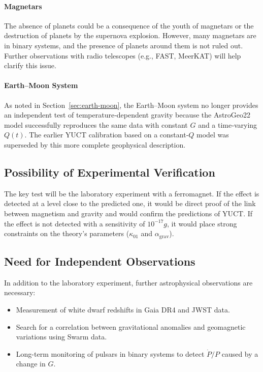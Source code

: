 \documentclass[12pt]{article}
\theoremstyle{remark}
\begin{document}
	\paragraph{Magnetars}
	The absence of planets could be a consequence of the youth of magnetars or the destruction of planets by the supernova explosion. However, many magnetars are in binary systems, and the presence of planets around them is not ruled out. Further observations with radio telescopes (e.g., FAST, MeerKAT) will help clarify this issue.
	
	\paragraph{Earth–Moon System}
	As noted in Section~\ref{sec:earth-moon}, the Earth–Moon system no longer provides an independent test of temperature‑dependent gravity because the AstroGeo22 model successfully reproduces the same data with constant \(G\) and a time‑varying \(Q(t)\). The earlier YUCT calibration based on a constant‑\(Q\) model was superseded by this more complete geophysical description.
	
	\subsection{Possibility of Experimental Verification}
	\label{subsec:discussion-experiment}
	
	The key test will be the laboratory experiment with a ferromagnet. If the effect is detected at a level close to the predicted one, it would be direct proof of the link between magnetism and gravity and would confirm the predictions of YUCT. If the effect is not detected with a sensitivity of $10^{-17}g$, it would place strong constraints on the theory's parameters ($\kappa_{01}$ and $\alpha_{\text{grav}}$).
	
	\subsection{Need for Independent Observations}
	\label{subsec:discussion-independent}
	
	In addition to the laboratory experiment, further astrophysical observations are necessary:
	\begin{itemize}
		\item Measurement of white dwarf redshifts in Gaia DR4 and JWST data.
		\item Search for a correlation between gravitational anomalies and geomagnetic variations using Swarm data.
		\item Long-term monitoring of pulsars in binary systems to detect $\dot{P}/P$ caused by a change in $G$.
	\end{itemize}
	
\end{document}
